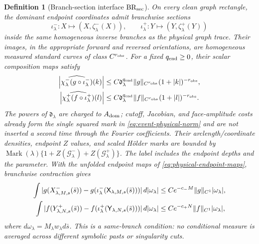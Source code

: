 \documentclass[11pt]{article}
\newtheorem{definition}[theorem]{Definition}
\begin{document}
\begin{definition}[Branch-section interface $\mathrm{BR}_{\rm sec}$]
\label{def:branch-section-interface}
On every clean graph rectangle, the dominant endpoint coordinates admit
branchwise sections
\[
 \iota^-_\lambda:X\mapsto(X,\zeta^-_\lambda(X)),\qquad
 \iota^+_\lambda:Y\mapsto(Y,\zeta^+_\lambda(Y))
\]
inside the same homogeneous inverse branches as the physical graph trace.
Their images, in the appropriate forward and reversed orientations, are
homogeneous measured standard curves of class $C^{r_{\rm obs}}$.  For a
fixed $q_{\rm end}\ge0$, their scalar composition maps satisfy
\begin{align}
 \left|\widehat{\chi^-_\lambda(g\circ\iota^-_\lambda)}(k)\right|
 &\le C\mathfrak d_\lambda^{q_{\rm end}}
       \|g\|_{C^{r_{\rm obs}}}
       (1+|k|)^{-r_{\rm obs}},\notag\\
 \left|\widehat{\chi^+_\lambda(f\circ\iota^+_\lambda)}(l)\right|
 &\le C\mathfrak d_\lambda^{q_{\rm end}}
       \|f\|_{C^{r_{\rm obs}}}
       (1+|l|)^{-r_{\rm obs}}.
 \label{eq:section-original-observable-fourier}
\end{align}
The powers of $\mathfrak d_\lambda$ are charged to $A_{\rm dom}$; cutoff,
Jacobian, and face-amplitude costs already form the single squared mark in
\eqref{eq:event-physical-norm} and are not inserted a second time through the
Fourier coefficients.  Their arclength/coordinate densities,
endpoint $Z$ values, and scaled H\"older marks are bounded by
$\operatorname{Mark}(\lambda)\{1+Z(\mathcal G^-_\lambda)+
Z(\mathcal G^+_\lambda)\}$.  The label includes the endpoint depths and the
parameter.  With the unfolded endpoint maps of
\eqref{eq:physical-endpoint-maps}, branchwise contraction gives
\begin{align}
 \int|g(X^-_{\lambda,M,s}(\bar s))-
 g(\iota^-_\lambda(\mathsf X_{\lambda,M,s}(\bar s)))|\,d|\omega_\lambda|
 &\le Ce^{-c_-M}\|g\|_{C^1}|\omega_\lambda|,\notag\\
 \int|f(Y^+_{\lambda,N,s}(\bar s))-
 f(\iota^+_\lambda(\mathsf Y_{\lambda,N,s}(\bar s)))|\,d|\omega_\lambda|
 &\le Ce^{-c_+N}\|f\|_{C^1}|\omega_\lambda|,
 \label{eq:branch-section-contraction}
\end{align}
where $d\omega_\lambda=M_\lambda w_\lambda d\bar s$.
This is a same-branch condition: no conditional measure is averaged across
different symbolic pasts or singularity cuts.
\end{definition}
\end{document}
